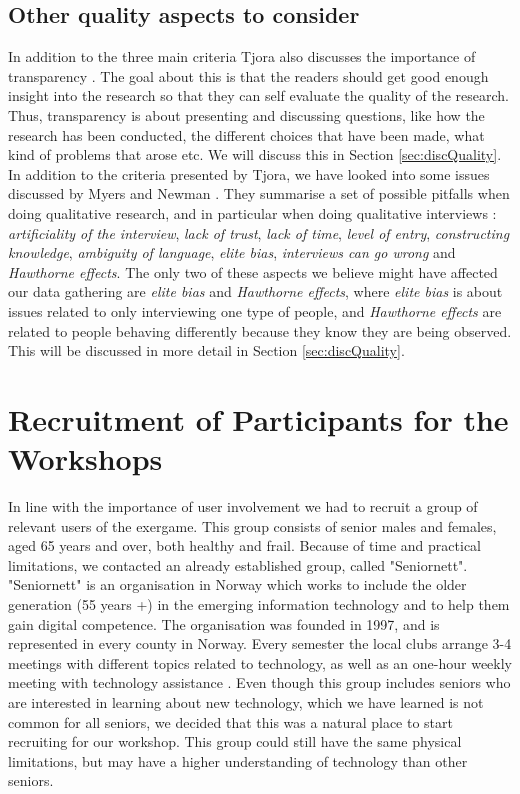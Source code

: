 \subsection{Other quality aspects to consider}
\label{sec:otherQualityAspects}
In addition to the three main criteria Tjora also discusses the importance of transparency \cite{tjora}. The goal about this is that the readers should get good enough insight into the research so that they can self evaluate the quality of the research. Thus, transparency is about presenting and discussing questions, like how the research has been conducted, the different choices that have been made, what kind of problems that arose etc. We will discuss this in Section \ref{sec:discQuality}. In addition to the criteria presented by Tjora, we have looked into some issues discussed by Myers and Newman \cite{interview}. They summarise a set of possible pitfalls when doing qualitative research, and in particular when doing qualitative interviews \cite{interview}: \emph{artificiality of the interview}, \emph{lack of trust}, \emph{lack of time}, \emph{level of entry}, \emph{constructing knowledge}, \emph{ambiguity of language}, \emph{elite bias}, \emph{interviews can go wrong} and \emph{Hawthorne effects}. The only two of these aspects we believe might have affected our data gathering are \emph{elite bias} and \emph{Hawthorne effects}, where \emph{elite bias} is about issues related to only interviewing one type of people, and \emph{Hawthorne effects} are related to people behaving differently because they know they are being observed. This will be discussed in more detail in Section \ref{sec:discQuality}.

\section{Recruitment of Participants for the Workshops}
\label{sec:recruitment}
In line with the importance of user involvement we had to recruit a group of relevant users of the exergame. This group consists of senior males and females, aged 65 years and over, both healthy and frail. Because of time and practical limitations, we contacted an already established group, called "Seniornett". "Seniornett" is an organisation in Norway which works to include the older generation (55 years +) in the emerging information technology and to help them gain digital competence. The organisation was founded in 1997, and is represented in every county in Norway. Every semester the local clubs arrange 3-4 meetings with different topics related to technology, as well as an one-hour weekly meeting with technology assistance \cite{seniornett}. Even though this group includes seniors who are interested in learning about new technology, which we have learned is not common for all seniors, we decided that this was a natural place to start recruiting for our workshop. This group could still have the same physical limitations, but may have a higher understanding of technology than other seniors. 

